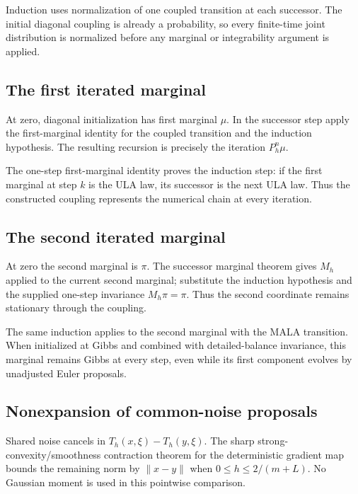 \documentclass[11pt,a4paper]{article}
\begin{document}
Induction uses normalization of one coupled transition at each successor. The initial diagonal coupling is already a probability, so every finite-time joint distribution is normalized before any marginal or integrability argument is applied.


\subsection{\texorpdfstring{The first iterated marginal}{The first iterated marginal}}


At zero, diagonal initialization has first marginal \(\mu\). In the successor step apply the first-marginal identity for the coupled transition and the induction hypothesis. The resulting recursion is precisely the iteration \(P_h^n\mu\).



The one-step first-marginal identity proves the induction step: if the first marginal at step \(k\) is the ULA law, its successor is the next ULA law. Thus the constructed coupling represents the numerical chain at every iteration.


\subsection{\texorpdfstring{The second iterated marginal}{The second iterated marginal}}


At zero the second marginal is \(\pi\). The successor marginal theorem gives \(M_h\) applied to the current second marginal; substitute the induction hypothesis and the supplied one-step invariance \(M_h\pi=\pi\). Thus the second coordinate remains stationary through the coupling.



The same induction applies to the second marginal with the MALA transition. When initialized at Gibbs and combined with detailed-balance invariance, this marginal remains Gibbs at every step, even while its first component evolves by unadjusted Euler proposals.


\subsection{\texorpdfstring{Nonexpansion of common-noise proposals}{Nonexpansion of common-noise proposals}}


Shared noise cancels in \(T_h(x,\xi)-T_h(y,\xi)\). The sharp strong-convexity/\allowbreak{}smoothness contraction theorem for the deterministic gradient map bounds the remaining norm by \(\|x-y\|\) when \(0\le h\le2/(m+L)\). No Gaussian moment is used in this pointwise comparison.
\end{document}
